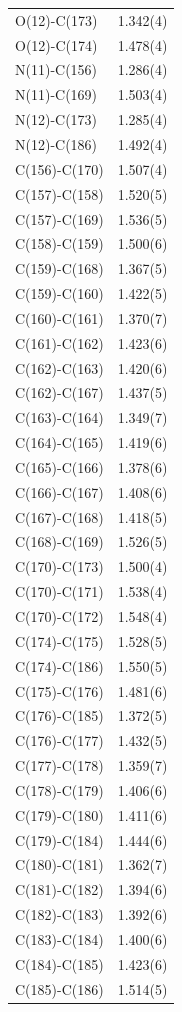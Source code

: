 \begin{center}
{\begin{supertabular}{p{1.5in}c}
O(12)-C(173) &1.342(4)\\
O(12)-C(174) &1.478(4)\\
N(11)-C(156) &1.286(4)\\
N(11)-C(169) &1.503(4)\\
N(12)-C(173) &1.285(4)\\
N(12)-C(186) &1.492(4)\\
C(156)-C(170) &1.507(4)\\
C(157)-C(158) &1.520(5)\\
C(157)-C(169) &1.536(5)\\
C(158)-C(159) &1.500(6)\\
C(159)-C(168) &1.367(5)\\
C(159)-C(160) &1.422(5)\\
C(160)-C(161) &1.370(7)\\
C(161)-C(162) &1.423(6)\\
C(162)-C(163) &1.420(6)\\
C(162)-C(167) &1.437(5)\\
C(163)-C(164) &1.349(7)\\
C(164)-C(165) &1.419(6)\\
C(165)-C(166) &1.378(6)\\
C(166)-C(167) &1.408(6)\\
C(167)-C(168) &1.418(5)\\
C(168)-C(169) &1.526(5)\\
C(170)-C(173) &1.500(4)\\
C(170)-C(171) &1.538(4)\\
C(170)-C(172) &1.548(4)\\
C(174)-C(175) &1.528(5)\\
C(174)-C(186) &1.550(5)\\
C(175)-C(176) &1.481(6)\\
C(176)-C(185) &1.372(5)\\
C(176)-C(177) &1.432(5)\\
C(177)-C(178) &1.359(7)\\
C(178)-C(179) &1.406(6)\\
C(179)-C(180) &1.411(6)\\
C(179)-C(184) &1.444(6)\\
C(180)-C(181) &1.362(7)\\
C(181)-C(182) &1.394(6)\\
C(182)-C(183) &1.392(6)\\
C(183)-C(184) &1.400(6)\\
C(184)-C(185) &1.423(6)\\
C(185)-C(186) &1.514(5)\\

\end{supertabular}}
\end{center}
